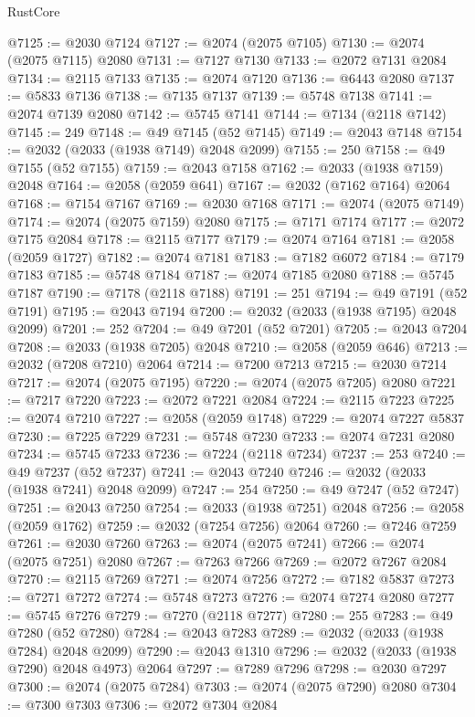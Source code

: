 \begin{lexlean}{RustCore}
\begin{coremodule}
@7125 := @2030 @7124
@7127 := @2074 (@2075 @7105)
@7130 := @2074 (@2075 @7115) @2080
@7131 := @7127 @7130
@7133 := @2072 @7131 @2084
@7134 := @2115 @7133
@7135 := @2074 @7120
@7136 := @6443 @2080
@7137 := @5833 @7136
@7138 := @7135 @7137
@7139 := @5748 @7138
@7141 := @2074 @7139 @2080
@7142 := @5745 @7141
@7144 := @7134 (@2118 @7142)
@7145 := 249
@7148 := @49 @7145 (@52 @7145)
@7149 := @2043 @7148
@7154 := @2032 (@2033 (@1938 @7149) @2048 @2099)
@7155 := 250
@7158 := @49 @7155 (@52 @7155)
@7159 := @2043 @7158
@7162 := @2033 (@1938 @7159) @2048
@7164 := @2058 (@2059 @641)
@7167 := @2032 (@7162 @7164) @2064
@7168 := @7154 @7167
@7169 := @2030 @7168
@7171 := @2074 (@2075 @7149)
@7174 := @2074 (@2075 @7159) @2080
@7175 := @7171 @7174
@7177 := @2072 @7175 @2084
@7178 := @2115 @7177
@7179 := @2074 @7164
@7181 := @2058 (@2059 @1727)
@7182 := @2074 @7181
@7183 := @7182 @6072
@7184 := @7179 @7183
@7185 := @5748 @7184
@7187 := @2074 @7185 @2080
@7188 := @5745 @7187
@7190 := @7178 (@2118 @7188)
@7191 := 251
@7194 := @49 @7191 (@52 @7191)
@7195 := @2043 @7194
@7200 := @2032 (@2033 (@1938 @7195) @2048 @2099)
@7201 := 252
@7204 := @49 @7201 (@52 @7201)
@7205 := @2043 @7204
@7208 := @2033 (@1938 @7205) @2048
@7210 := @2058 (@2059 @646)
@7213 := @2032 (@7208 @7210) @2064
@7214 := @7200 @7213
@7215 := @2030 @7214
@7217 := @2074 (@2075 @7195)
@7220 := @2074 (@2075 @7205) @2080
@7221 := @7217 @7220
@7223 := @2072 @7221 @2084
@7224 := @2115 @7223
@7225 := @2074 @7210
@7227 := @2058 (@2059 @1748)
@7229 := @2074 @7227 @5837
@7230 := @7225 @7229
@7231 := @5748 @7230
@7233 := @2074 @7231 @2080
@7234 := @5745 @7233
@7236 := @7224 (@2118 @7234)
@7237 := 253
@7240 := @49 @7237 (@52 @7237)
@7241 := @2043 @7240
@7246 := @2032 (@2033 (@1938 @7241) @2048 @2099)
@7247 := 254
@7250 := @49 @7247 (@52 @7247)
@7251 := @2043 @7250
@7254 := @2033 (@1938 @7251) @2048
@7256 := @2058 (@2059 @1762)
@7259 := @2032 (@7254 @7256) @2064
@7260 := @7246 @7259
@7261 := @2030 @7260
@7263 := @2074 (@2075 @7241)
@7266 := @2074 (@2075 @7251) @2080
@7267 := @7263 @7266
@7269 := @2072 @7267 @2084
@7270 := @2115 @7269
@7271 := @2074 @7256
@7272 := @7182 @5837
@7273 := @7271 @7272
@7274 := @5748 @7273
@7276 := @2074 @7274 @2080
@7277 := @5745 @7276
@7279 := @7270 (@2118 @7277)
@7280 := 255
@7283 := @49 @7280 (@52 @7280)
@7284 := @2043 @7283
@7289 := @2032 (@2033 (@1938 @7284) @2048 @2099)
@7290 := @2043 @1310
@7296 := @2032 (@2033 (@1938 @7290) @2048 @4973) @2064
@7297 := @7289 @7296
@7298 := @2030 @7297
@7300 := @2074 (@2075 @7284)
@7303 := @2074 (@2075 @7290) @2080
@7304 := @7300 @7303
@7306 := @2072 @7304 @2084

\end{coremodule}
\end{lexlean}
